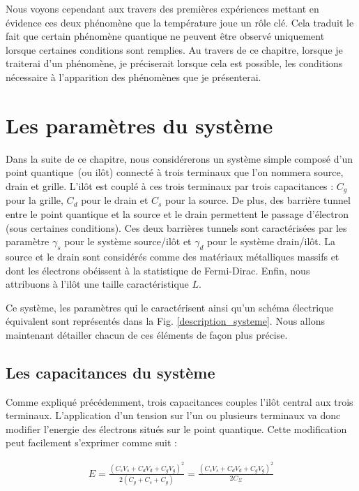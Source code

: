 Nous voyons cependant aux travers des premières expériences mettant en évidence ces deux phénomène que la température joue un rôle clé. Cela traduit le fait que certain phénomène quantique ne peuvent être observé uniquement lorsque certaines conditions sont remplies. Au travers de ce chapitre, lorsque je traiterai d'un phénomène, je préciserait lorsque cela est possible, les conditions nécessaire à l'apparition des phénomènes que je présenterai.


\section{Les paramètres du système}
Dans la suite de ce chapitre, nous considérerons un système simple composé d'un point quantique~(ou ilôt) connecté à trois terminaux que l'on nommera source, drain et grille. L'il\^ot est couplé à ces trois terminaux par trois capacitances : $C_g$ pour la grille, $C_d$ pour le drain et $C_s$ pour la source. De plus, des barrière tunnel entre le point quantique et la source et le drain permettent le passage d'électron (sous certaines conditions). Ces deux barrières tunnels sont caractérisées par les paramètre $\gamma_s$ pour le système source/il\^ot et $\gamma_d$ pour le système drain/il\^ot. La source et le drain sont considérés comme des matériaux métalliques massifs et dont les électrons obéissent à la statistique de Fermi-Dirac. Enfin, nous attribuons à l'il\^ot une taille caractéristique $L$. 

Ce système, les paramètres qui le caractérisent ainsi qu'un schéma électrique équivalent sont représentés dans la Fig. \ref{description_systeme}. Nous allons maintenant détailler chacun de ces éléments de façon plus précise.


\subsection{Les capacitances du système}
Comme expliqué précédemment, trois capacitances couples l'il\^ot central aux trois terminaux. L'application d'un tension sur l'un ou plusieurs terminaux va donc modifier l'energie des électrons situés sur le point quantique. Cette modification peut facilement s'exprimer comme suit :

\begin{eqnarray}
E = \frac{(C_sV_s + C_dV_d + C_gV_g)^2}{2(C_g + C_s + C_g)}=\frac{(C_sV_s + C_dV_d + C_gV_g)^2}{2C_{\Sigma}} \nonumber
\end{eqnarray}

